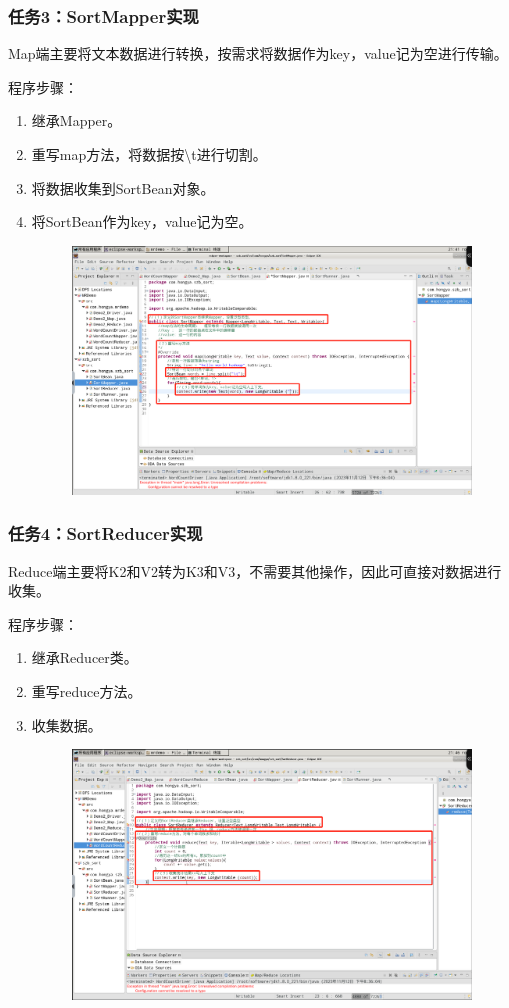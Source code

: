 \documentclass {article}
\begin{document}
			\subsubsection{任务3：SortMapper实现}
				Map端主要将文本数据进行转换，按需求将数据作为key，value记为空进行传输。
				
				程序步骤：
				\begin{enumerate}
					\item 继承Mapper。
					\item 重写map方法，将数据按\textbackslash{}t进行切割。
					\item 将数据收集到SortBean对象。
					\item 将SortBean作为key，value记为空。
					\begin{figure}[H]
						\centering
						\includegraphics[width=4.5in]{figures/fig4.png}
					\end{figure}
				\end{enumerate}
				
			\subsubsection{任务4：SortReducer实现}
				Reduce端主要将K2和V2转为K3和V3，不需要其他操作，因此可直接对数据进行收集。
				
				程序步骤：
				\begin{enumerate}
					\item 继承Reducer类。
					\item 重写reduce方法。
					\item 收集数据。
					\begin{figure}[H]
						\centering
						\includegraphics[width=4.5in]{figures/fig5.png}
					\end{figure}
				\end{enumerate}
			
\end{document}
